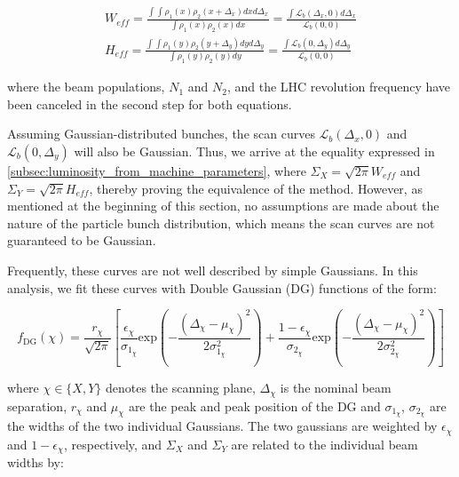 {\begin{equation}
    \begin{aligned}
        \label{eq:effective_width_height_scan}
        W_{eff} = \frac{\int \int \rho_1 (x) \rho_2 (x + \Delta_x) dx d\Delta_x}{\int \rho_1 (x) \rho_2 (x) dx} = \frac{\int \mathcal{L}_b \left( \Delta_x, 0 \right) d\Delta_x}{\mathcal{L}_b \left( 0, 0 \right)} \\
        H_{eff} = \frac{\int \int \rho_1 (y) \rho_2 (y + \Delta_y) dy d\Delta_y}{\int \rho_1 (y) \rho_2 (y) dy} = \frac{\int \mathcal{L}_b \left( 0, \Delta_y \right) d\Delta_y}{\mathcal{L}_b \left( 0, 0 \right)}
    \end{aligned}
\end{equation}

where the beam populations, $N_1$ and $N_2$, and the LHC revolution frequency have been canceled in the second step for both equations.

Assuming Gaussian-distributed bunches, the scan curves $\mathcal{L}_b \left( \Delta_x, 0 \right)$ and $\mathcal{L}_b \left( 0, \Delta_y \right)$ will also be Gaussian. Thus, we arrive at the equality expressed in \autoref{subsec:luminosity_from_machine_parameters}, where $\Sigma_X = \sqrt{2\pi} W_{eff}$ and $\Sigma_Y = \sqrt{2\pi} H_{eff}$, thereby proving the equivalence of the method. However, as mentioned at the beginning of this section, no assumptions are made about the nature of the particle bunch distribution, which means the scan curves are not guaranteed to be Gaussian.

Frequently, these curves are not well described by simple Gaussians. In this analysis, we fit these curves with Double Gaussian (DG) functions of the form:

\begin{equation}
    f_{\text{DG}}(\chi) = 
    \frac{r_{\chi}}{\sqrt{2\pi}} 
    \left[ 
        \frac{\epsilon_{\chi}}{\sigma_{1_{\chi}}} \text{exp} \left( -\frac{\left( \Delta_{\chi} - \mu_{\chi} \right)^2}{2\sigma^2_{1_{\chi}}} \right) +
        \frac{1 - \epsilon_{\chi}}{\sigma_{2_{\chi}}} \text{exp} \left( -\frac{\left( \Delta_{\chi} - \mu_{\chi} \right)^2}{2\sigma^2_{2_{\chi}}} \right)
    \right]
    \label{eq:double_gaussian_model}
\end{equation}

where $\chi \in \{X, Y\}$ denotes the scanning plane, $\Delta_{\chi}$ is the nominal beam separation, $r_{\chi}$ and $\mu_{\chi}$ are the peak and peak position of the DG and $\sigma_{1_{\chi}}$, $\sigma_{2_{\chi}}$ are the widths of the two individual Gaussians. The two gaussians are weighted by $\epsilon_{\chi}$ and $1 - \epsilon_{\chi}$, respectively, and $\Sigma_{X}$ and $\Sigma_{Y}$ are related to the individual beam widths by: 

}
